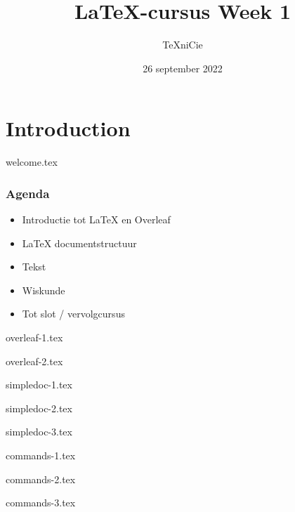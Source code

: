 \documentclass[allauthors,dutch]{../../cursuspresentatie}
\title{\LaTeX{}-cursus Week 1}
\author{\TeX niCie}
\date{26 september 2022}
\def\importslide#1#2{%
	{#2}
}
\begin{document}
\section{Introduction}
\importslide{beginners}{welcome.tex}

\begin{frame}
	\frametitle{Agenda}
	
	\begin{itemize}
		\item Introductie tot LaTeX en Overleaf
		\item LaTeX documentstructuur
		\item Tekst
		\item Wiskunde
		\item Tot slot / vervolgcursus
	\end{itemize}
\end{frame}

\importslide{beginners_NL}{overleaf-1.tex}
\importslide{beginners_NL}{overleaf-2.tex}


\importslide{beginners_NL}{simpledoc-1.tex}
\importslide{beginners_NL}{simpledoc-2.tex}
\importslide{beginners_NL}{simpledoc-3.tex}


\importslide{beginners_NL}{commands-1.tex}
\importslide{beginners_NL}{commands-2.tex}
\importslide{beginners_NL}{commands-3.tex}
\end{document}
